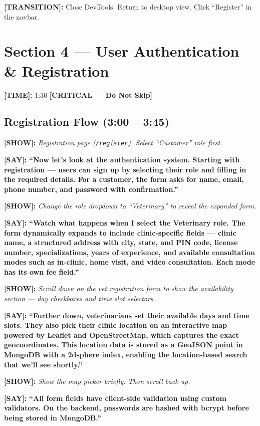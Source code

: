 \documentclass[12pt,a4paper]{article}
\newcommand{\say}[1]{\textbf{\textcolor{narration}{[SAY]:}} \textbf{``#1''}}
\newcommand{\show}[1]{\textbf{\textcolor{screen}{[SHOW]:}} \textit{#1}}
\newcommand{\timing}[1]{\textbf{\textcolor{timing}{[TIME]:}} #1}
\newcommand{\trans}[1]{\textbf{\textcolor{transition}{[TRANSITION]:}} #1}
\newcommand{\critical}{\textcolor{critical}{\textbf{[CRITICAL --- Do Not Skip]}}}
\begin{document}
\trans{Close DevTools. Return to desktop view. Click ``Register'' in the navbar.}

\newpage

\section{Section 4 --- User Authentication \& Registration}
\label{sec:auth}

\timing{1:30} \hfill \critical

\subsection{Registration Flow (3:00 -- 3:45)}

\show{Registration page (\texttt{/register}). Select ``Customer'' role first.}

\say{Now let's look at the authentication system. Starting with registration --- users can sign up by selecting their role and filling in the required details. For a customer, the form asks for name, email, phone number, and password with confirmation.}

\show{Change the role dropdown to ``Veterinary'' to reveal the expanded form.}

\say{Watch what happens when I select the Veterinary role. The form dynamically expands to include clinic-specific fields --- clinic name, a structured address with city, state, and PIN code, license number, specializations, years of experience, and available consultation modes such as in-clinic, home visit, and video consultation. Each mode has its own fee field.}

\show{Scroll down on the vet registration form to show the availability section --- day checkboxes and time slot selectors.}

\say{Further down, veterinarians set their available days and time slots. They also pick their clinic location on an interactive map powered by Leaflet and OpenStreetMap, which captures the exact geocoordinates. This location data is stored as a GeoJSON point in MongoDB with a 2dsphere index, enabling the location-based search that we'll see shortly.}

\show{Show the map picker briefly. Then scroll back up.}

\say{All form fields have client-side validation using custom validators. On the backend, passwords are hashed with bcrypt before being stored in MongoDB.}
\end{document}
